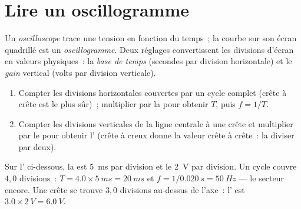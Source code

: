 \section{Lire un oscillogramme}

\begin{definition}[Oscilloscope]\label{def:g10:signals-and-waves:oscilloscope}
Un \emph{oscilloscope} trace une tension en fonction
du temps~; la courbe sur son écran quadrillé est un
\emph{oscillogramme}. Deux réglages convertissent
les divisions d'écran en valeurs physiques~: la \emph{base de
temps} (secondes par division horizontale) et le
\emph{gain} vertical (volts par division verticale).
\end{definition}

\begin{method}\label{met:g10:signals-and-waves:oscillogram}
\begin{enumerate}
  \item Compter les divisions horizontales couvertes par un cycle
        complet (crête à crête est le plus sûr)~; multiplier par la
         pour obtenir $T$, puis $f = 1/T$.
  \item Compter les divisions verticales de la ligne centrale à une
        crête et multiplier par le  pour obtenir
        l' (crête à creux donne la valeur crête
        à crête~: la diviser par deux).
\end{enumerate}
\end{method}

\begin{example}\label{ex:g10:signals-and-waves:reading}
Sur l' ci-dessous, la
 est \qty{5}{ms} par division et le
 \qty{2}{V} par division. Un cycle couvre $4{,}0$
divisions~: $T = 4.0 \times \qty{5}{ms} = \qty{20}{ms}$ et
$f = 1/\qty{0.020}{s} = \qty{50}{Hz}$ --- le secteur encore. Une crête
se trouve $3{,}0$ divisions au-dessus de l'axe~:
l' est $3.0 \times \qty{2}{V} = \qty{6.0}{V}$.
\end{example}

